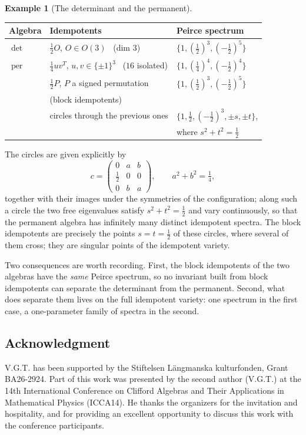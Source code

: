 \documentclass[times,11pt,reqno]{amsproc}
\theoremstyle{definition}
\newtheorem{example}[theorem]{Example}
\numberwithin{equation}{section}
\begin{document}
\begin{example}[The determinant and the permanent]
\begin{center}
\begin{tabular}{l|l|l}
Algebra & Idempotents
& Peirce spectrum\\
\midrule
$\det$
 & $\tfrac12O$, $O\in O(3)$ \ (dim $3$)
 & $\{1,(\tfrac12)^3,(-\tfrac12)^5\}$\\
\midrule
$\operatorname{per}$
 & $\tfrac14uv^{T}$, $u,v\in\{\pm1\}^3$ \ ($16$ isolated)
 & $\{1,(\tfrac14)^4,(-\tfrac12)^4\}$\\
 & $\tfrac12P$, $P$ a signed permutation
 & $\{1,(\tfrac12)^3,(-\tfrac12)^5\}$\\
 &(block idempotents)\\
 & circles through the previous ones
 & $\{1,\tfrac12,(-\tfrac12)^3,\pm s,\pm t\}$,\\
 && where $s^2+t^2=\tfrac12$
\end{tabular}
\end{center}

The circles are given explicitly by
$$
c=
\begin{pmatrix}
0&a&b\\ \tfrac12&0&0\\ 0&b&a
\end{pmatrix},
\qquad
a^2+b^2=\tfrac14,
$$
together with their images under the symmetries of the configuration;
along such a circle the two free eigenvalues satisfy
$s^2+t^2=\tfrac12$ and vary continuously, so that the permanent algebra
has infinitely many distinct idempotent spectra. The block idempotents
are precisely the points $s=t=\tfrac12$ of these circles, where several
of them cross; they are singular points of the idempotent variety.

Two consequences are worth recording. First, the block idempotents of the
two algebras have the \emph{same} Peirce spectrum, so no invariant built
from block idempotents can separate the determinant from the permanent.
Second, what does separate them lives on the full idempotent variety: one
spectrum in the first case, a one-parameter family of spectra in the
second.
\end{example}




\subsection*{Acknowledgment}
V.G.T. has been supported by the Stiftelsen L\"angmanska kulturfonden, Grant BA26-2924.
Part of this work was presented by the second author (V.G.T.) at the 14th International Conference on Clifford Algebras and Their Applications in Mathematical Physics (ICCA14). He thanks the organizers for the invitation and hospitality, and for providing an excellent opportunity to discuss this work with the conference participants.
\end{document}
